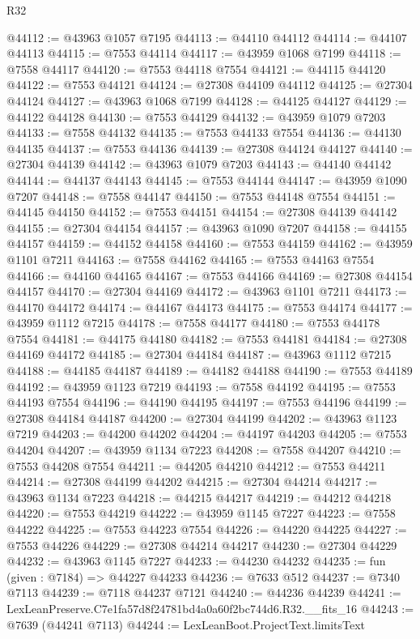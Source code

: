 \begin{lexlean}{R32}
\begin{coremodule}
@44112 := @43963 @1057 @7195
@44113 := @44110 @44112
@44114 := @44107 @44113
@44115 := @7553 @44114
@44117 := @43959 @1068 @7199
@44118 := @7558 @44117
@44120 := @7553 @44118 @7554
@44121 := @44115 @44120
@44122 := @7553 @44121
@44124 := @27308 @44109 @44112
@44125 := @27304 @44124
@44127 := @43963 @1068 @7199
@44128 := @44125 @44127
@44129 := @44122 @44128
@44130 := @7553 @44129
@44132 := @43959 @1079 @7203
@44133 := @7558 @44132
@44135 := @7553 @44133 @7554
@44136 := @44130 @44135
@44137 := @7553 @44136
@44139 := @27308 @44124 @44127
@44140 := @27304 @44139
@44142 := @43963 @1079 @7203
@44143 := @44140 @44142
@44144 := @44137 @44143
@44145 := @7553 @44144
@44147 := @43959 @1090 @7207
@44148 := @7558 @44147
@44150 := @7553 @44148 @7554
@44151 := @44145 @44150
@44152 := @7553 @44151
@44154 := @27308 @44139 @44142
@44155 := @27304 @44154
@44157 := @43963 @1090 @7207
@44158 := @44155 @44157
@44159 := @44152 @44158
@44160 := @7553 @44159
@44162 := @43959 @1101 @7211
@44163 := @7558 @44162
@44165 := @7553 @44163 @7554
@44166 := @44160 @44165
@44167 := @7553 @44166
@44169 := @27308 @44154 @44157
@44170 := @27304 @44169
@44172 := @43963 @1101 @7211
@44173 := @44170 @44172
@44174 := @44167 @44173
@44175 := @7553 @44174
@44177 := @43959 @1112 @7215
@44178 := @7558 @44177
@44180 := @7553 @44178 @7554
@44181 := @44175 @44180
@44182 := @7553 @44181
@44184 := @27308 @44169 @44172
@44185 := @27304 @44184
@44187 := @43963 @1112 @7215
@44188 := @44185 @44187
@44189 := @44182 @44188
@44190 := @7553 @44189
@44192 := @43959 @1123 @7219
@44193 := @7558 @44192
@44195 := @7553 @44193 @7554
@44196 := @44190 @44195
@44197 := @7553 @44196
@44199 := @27308 @44184 @44187
@44200 := @27304 @44199
@44202 := @43963 @1123 @7219
@44203 := @44200 @44202
@44204 := @44197 @44203
@44205 := @7553 @44204
@44207 := @43959 @1134 @7223
@44208 := @7558 @44207
@44210 := @7553 @44208 @7554
@44211 := @44205 @44210
@44212 := @7553 @44211
@44214 := @27308 @44199 @44202
@44215 := @27304 @44214
@44217 := @43963 @1134 @7223
@44218 := @44215 @44217
@44219 := @44212 @44218
@44220 := @7553 @44219
@44222 := @43959 @1145 @7227
@44223 := @7558 @44222
@44225 := @7553 @44223 @7554
@44226 := @44220 @44225
@44227 := @7553 @44226
@44229 := @27308 @44214 @44217
@44230 := @27304 @44229
@44232 := @43963 @1145 @7227
@44233 := @44230 @44232
@44235 := fun (given : @7184) => @44227 @44233
@44236 := @7633 @512
@44237 := @7340 @7113
@44239 := @7118 @44237 @7121
@44240 := @44236 @44239
@44241 := LexLeanPreserve.C7e1fa57d8f24781bd4a0a60f2bc744d6.R32.__fits_16
@44243 := @7639 (@44241 @7113)
@44244 := LexLeanBoot.ProjectText.limitsText

\end{coremodule}
\end{lexlean}
